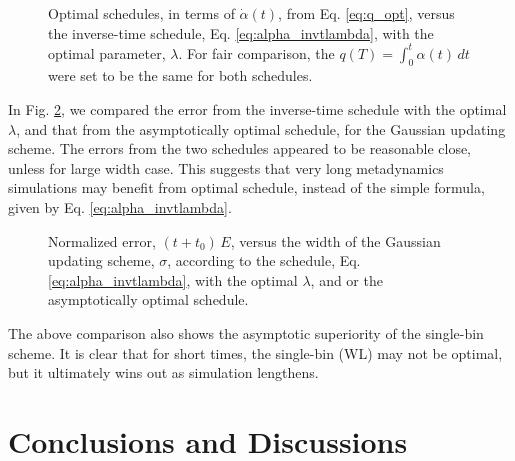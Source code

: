 \documentclass[reprint, floatfix]{revtex4-1}
\begin{document}
\begin{figure}[h]
\begin{center}
  \caption{
    \label{fig:alpha_cmp}
    Optimal schedules, in terms of $\dot \alpha(t)$, from Eq. \eqref{eq:q_opt},
    versus the inverse-time schedule,
    Eq. \eqref{eq:alpha_invtlambda},
    with the optimal parameter, $\lambda$.
    For fair comparison,
    the $q(T) = \int_0^t \alpha(t) \, dt$
    were set to be the same
    for both schedules.
  }
\end{center}
\end{figure}


In Fig. \ref{fig:err_sigscan},
we compared the error from the inverse-time schedule
with the optimal $\lambda$,
and that from the asymptotically optimal schedule,
for the Gaussian updating scheme.
%
The errors from the two schedules appeared to be reasonable close,
unless for large width case.
%
This suggests that very long metadynamics simulations
may benefit from optimal schedule,
instead of the simple formula, given by
Eq. \eqref{eq:alpha_invtlambda}.


\begin{figure}[h]
\begin{center}
  \caption{
    \label{fig:err_sigscan}
    Normalized error, $(t + t_0) \, E$,
    versus the width of the Gaussian updating scheme,
    $\sigma$,
    according to the schedule,
    Eq. \eqref{eq:alpha_invtlambda},
    with the optimal $\lambda$,
    and or the asymptotically optimal schedule.
  }
\end{center}
\end{figure}






The above comparison also shows the asymptotic superiority
of the single-bin scheme.
It is clear that for short times,
the single-bin (WL) may not be optimal,
but it ultimately wins out as simulation lengthens.

%
%


\section{\label{sec:conclusion}
Conclusions and Discussions}
\end{document}
